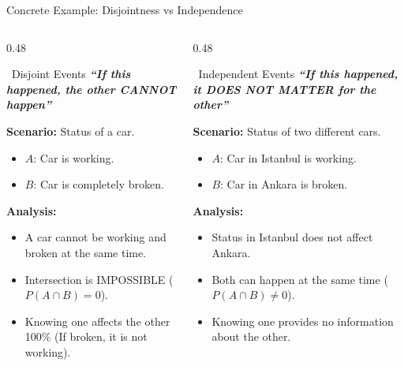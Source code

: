 \documentclass[light]{lutbeamer}
\begin{document}
\begin{frame}{Concrete Example: Disjointness vs Independence}
    \begin{columns}[T]
        \begin{column}{0.48\textwidth}
            \begin{block}{\faLink\ Disjoint Events}
                \textbf{\textit{``If this happened, the other CANNOT happen''}}
                \vspace{0.2cm}
                
                \textbf{Scenario:} Status of a car.
                \begin{itemize}
                    \item \(A\): Car is working.
                    \item \(B\): Car is completely broken.
                \end{itemize}
                
                \textbf{Analysis:}
                \begin{itemize}
                    \item A car cannot be working and broken at the same time.
                    \item Intersection is IMPOSSIBLE ($P(A\cap B)=0$).
                    \item Knowing one affects the other 100\% (If broken, it is not working).
                \end{itemize}
            \end{block}
        \end{column}
        \begin{column}{0.48\textwidth}
            \begin{block}{\faUnlink\ Independent Events}
                \textbf{\textit{``If this happened, it DOES NOT MATTER for the other''}}
                \vspace{0.2cm}
                
                \textbf{Scenario:} Status of two different cars.
                \begin{itemize}
                    \item \(A\): Car in Istanbul is working.
                    \item \(B\): Car in Ankara is broken.
                \end{itemize}
                
                \textbf{Analysis:}
                \begin{itemize}
                    \item Status in Istanbul does not affect Ankara.
                    \item Both can happen at the same time ($P(A\cap B) \neq 0$).
                    \item Knowing one provides no information about the other.
                \end{itemize}
            \end{block}       
        \end{column}
    \end{columns}
\end{frame}
\end{document}
